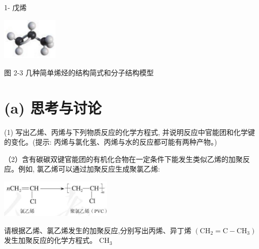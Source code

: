 \documentclass[10pt]{article}
\begin{document}
1- 戊烯

\begin{center}
\includegraphics[max width=0.2\textwidth]{images/0190efc5-b58a-7c43-bfb0-e0a030df9cfd_40_877361.jpg}
\end{center}

图 2-3 几种简单烯烃的结构简式和分子结构模型

\section*{(a) 思考与讨论}

(1) 写出乙烯、丙烯与下列物质反应的化学方程式, 并说明反应中官能团和化学键的变化。(提示: 丙烯与氯化氢、丙烯与水的反应都可能有两种产物。)

\begin{center}
\end{center}

（2）含有碳碳双键官能团的有机化合物在一定条件下能发生类似乙烯的加聚反应。例如, 氯乙烯可以通过加聚反应生成聚氯乙烯:

\begin{center}
\includegraphics[max width=0.4\textwidth]{images/0190efc5-b58a-7c43-bfb0-e0a030df9cfd_40_374768.jpg}
\end{center}

请根据乙烯、氯乙烯发生的加聚反应,分别写出丙烯、异丁烯 \(\left( {{\mathrm{{CH}}}_{2} = \mathrm{C} - {\mathrm{{CH}}}_{3}}\right)\) 发生加聚反应的化学方程式。 \({\mathrm{{CH}}}_{3}\)
\end{document}
